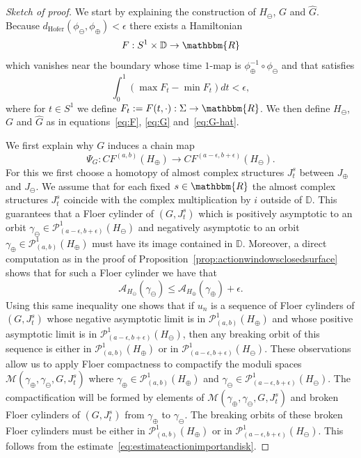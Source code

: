\documentclass[AHL,Unicode,longabstracts,published]{cedram}
\newcommand{\R}{\mathbbm{R}}
\newcommand{\D}{\mathbb{D}}
\newcommand{\hofer}{\mathrm{Hofer}}
\newcommand{\clP}{\mathcal{P}}
\newcommand{\clA}{\mathcal{A}}
\newcommand{\clM}{\mathcal{M}}
\newcommand{\hofer}{\mathrm{Hofer}}
\begin{document}
\begin{proof}[Sketch of proof]
We start by explaining the construction of $H_\ominus$, $G$ and $\widehat{G}$. Because $d_{\hofer}(\phi_\ominus,\phi_\oplus)<\epsilon $ there exists a Hamiltonian
\begin{equation}\label{eq:H-minus}
F:S^1\times \D \to \R
\end{equation}
which vanishes near the boundary whose time $1$-map is $\phi^{-1}_\oplus \circ \phi_\ominus$ and that satisfies
\begin{equation}\label{eq:Hofer-distance}
\int_0^1 (\max F_t - \min F_t) dt< \epsilon,
\end{equation}
where for $t\in S^1$ we define $F_t:=F(t,\cdot): \Sigma \to \R$. We then define $H_\ominus$, $G$ and $\widehat{G}$ as in equations~\eqref{eq:F}, \eqref{eq:G} and~\eqref{eq:G-hat}.

We first explain why $G$ induces a chain map
\[
\Psi_G: CF^{(a,b)}(H_\oplus) \to CF^{(a-\epsilon, b+\epsilon)}(H_\ominus).
\]
For this we first choose a homotopy of almost complex structures $J^s_t$ between $J_\oplus$ and $J_\ominus$. We assume that for each fixed $s \in \R$ the almost complex structures $J^s_t$ coincide with the complex multiplication by ${i}$ outside of $\D$. This guarantees that a Floer cylinder of $(G,J^s_t)$ which is positively asymptotic to an orbit $\gamma_\ominus \in \clP^1_{(a-\epsilon,b+\epsilon)}(H_\ominus)$ and negatively asymptotic to an orbit
$\gamma_\oplus \in \clP^1_{(a,b)}(H_\oplus)$ must have its image contained in $\D$. Moreover, a direct computation as in the proof of Proposition~\ref{prop:actionwindowsclosedsurface} shows that for such a Floer cylinder we have that
\begin{equation}\label{eq:estimateactionimportandisk}
\clA_{H_\ominus}(\gamma_\ominus) \leq \clA_{H_\oplus}(\gamma_\oplus) +\epsilon.
\end{equation}
Using this same inequality one shows that if $u_n$ is a sequence of Floer cylinders of $(G,J^s_t)$ whose negative asymptotic limit is in $\clP^1_{(a,b)}(H_\oplus)$ and whose positive asymptotic limit is in $\clP^1_{(a-\epsilon,b+\epsilon)}(H_\ominus)$, then any breaking orbit of this sequence is either in $\clP^1_{(a,b)}(H_\oplus)$ or in $\clP^1_{(a-\epsilon,b+\epsilon)}(H_\ominus)$. These observations allow us to apply Floer compactness to compactify the moduli spaces $\clM(\gamma_\oplus,\gamma_\ominus,G,J^s_t)$ where $\gamma_\oplus \in \clP^1_{(a,b)}(H_\oplus)$ and $\gamma_\ominus \in \clP^1_{(a-\epsilon,b+\epsilon)}(H_\ominus)$. The compactification will be formed by elements of $\clM(\gamma_\oplus,\gamma_\ominus,G,J^s_t)$ and broken Floer cylinders of $(G,J^s_t)$ from $\gamma_\oplus$ to $\gamma_\ominus$. The breaking orbits of these broken Floer cylinders must be either in $\clP^1_{(a,b)}(H_\oplus)$ or in $\clP^1_{(a-\epsilon,b+\epsilon)}(H_\ominus)$. This follows from the estimate~\eqref{eq:estimateactionimportandisk}.


\end{proof}
\end{document}
